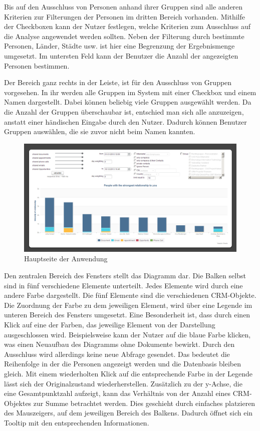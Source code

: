 Bis auf den Ausschluss von Personen anhand ihrer Gruppen sind alle anderen Kriterien zur Filterungen der Personen im dritten Bereich vorhanden. Mithilfe der Checkboxen kann der Nutzer festlegen, welche Kriterien zum Ausschluss auf die Analyse angewendet werden sollten. Neben der Filterung durch bestimmte Personen, Länder, Städte usw. ist hier eine Begrenzung der Ergebnismenge umgesetzt. Im untersten Feld kann der Benutzer die Anzahl der angezeigten Personen bestimmen.

Der Bereich ganz rechts in der Leiste, ist für den Ausschluss von Gruppen vorgesehen. In ihr werden alle Gruppen im System mit einer Checkbox und einem Namen dargestellt. Dabei können beliebig viele Gruppen ausgewählt werden. Da die Anzahl der Gruppen überschaubar ist, entschied man sich alle anzuzeigen, anstatt einer händischen Eingabe durch den Nutzer. Dadurch können Benutzer Gruppen auswählen, die sie zuvor nicht beim Namen kannten.

\begin{figure}[htbp]
\centering
\includegraphics[width=\textwidth]{pics/final_screen.png}
\caption{Hauptseite der Anwendung}
\label{ergebniss_oberflaeche_haupt}
\end{figure}

Den zentralen Bereich des Fensters stellt das Diagramm dar. Die Balken selbst sind in fünf verschiedene Elemente unterteilt. Jedes Elemente wird durch eine andere Farbe dargestellt. Die fünf Elemente sind die verschiedenen CRM-Objekte. Die Zuordnung der Farbe zu dem jeweiligen Element, wird über eine Legende im unteren Bereich des Fensters umgesetzt. Eine Besonderheit ist, dass durch einen Klick auf eine der Farben, das jeweilige Element von der Darstellung ausgeschlossen wird. Beispielsweise kann der Nutzer auf die blaue Farbe klicken, was einen Neuaufbau des Diagramms ohne Dokumente bewirkt. Durch den Ausschluss wird allerdings keine neue Abfrage gesendet. Das  bedeutet die Reihenfolge in der die Personen angezeigt werden und die Datenbasis bleiben gleich. Mit einem wiederholten Klick auf die entsprechende Farbe in der Legende lässt sich der Originalzustand wiederherstellen. Zusätzlich zu der y-Achse, die eine Gesamtpunktzahl aufzeigt, kann das Verhältnis von der Anzahl eines CRM-Objektes zur Summe betrachtet werden. Dies geschieht durch einfaches platzieren des Mauszeigers, auf dem jeweiligen Bereich des Balkens. Dadurch öffnet sich ein Tooltip mit den entsprechenden Informationen.

